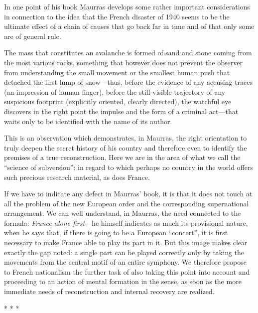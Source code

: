 In one point of his book Maurras develops some rather important considerations in connection to the idea that the French disaster of 1940 seems to be the ultimate effect of a chain of causes that go back far in time and of that only some are of general rule.

\begin{quotex}
The mass that constitutes an avalanche is formed of sand and stone coming from the most various rocks, something that however does not prevent the observer from understanding the small movement or the smallest human push that detached the first lump of snow---thus, before the evidence of any accusing traces (an impression of human finger), before the still visible trajectory of any suspicious footprint (explicitly oriented, clearly directed), the watchful eye discovers in the right point the impulse and the form of a criminal act---that waits only to be identified with the name of its author.
\end{quotex}


This is an observation which demonstrates, in Maurras, the right orientation to truly deepen the secret history of his country and therefore even to identify the premises of a true reconstruction. Here we are in the area of what we call the ``science of subversion'': in regard to which perhaps no country in the world offers such precious research material, as does France.

If we have to indicate any defect in Maurras' book, it is that it does not touch at all the problem of the new European order and the corresponding supernational arrangement. We can well understand, in Maurras, the need connected to the formula: \emph{France alone first}---he himself indicates as much its provisional nature, when he says that, if there is going to be a European ``concert'', it is first necessary to make France able to play its part in it. But this image makes clear exactly the gap noted: a single part can be played correctly only by taking the movements from the central motif of an entire symphony. We therefore propose to French nationalism the further task of also taking this point into account and proceeding to an action of mental formation in the sense, as soon as the more immediate needs of reconstruction and internal recovery are realized.


\begin{center}* * *\end{center}

